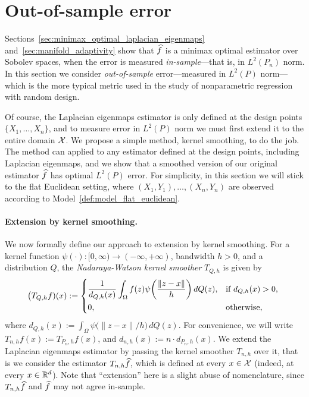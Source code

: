 \section{Out-of-sample error}
\label{sec:out_of_sample}
Sections~\ref{sec:minimax_optimal_laplacian_eigenmaps} and~\ref{sec:manifold_adaptivity} show that $\widehat{f}$ is a minimax optimal estimator over Sobolev spaces, when the error is measured \emph{in-sample}---that is, in $L^2(P_n)$ norm. In this section we consider \emph{out-of-sample} error---measured in $L^2(P)$ norm---which is the more typical metric used in the study of nonparametric regression with random design. 

Of course, the Laplacian eigenmaps estimator is only defined at the design points $\{X_1,\ldots,X_n\}$, and to measure error in $L^2(P)$ norm we must first extend it to the entire domain $\mathcal{X}$. We propose a simple method, kernel smoothing, to do the job. The method can applied to any estimator defined at the design points, including Laplacian eigenmaps, and we show that a smoothed version of our original estimator $\widehat{f}$ has optimal $L^2(P)$ error. For simplicity, in this section we will stick to the flat Euclidean setting, where $(X_1,Y_1),\ldots,(X_n,Y_n)$ are observed according to Model~\ref{def:model_flat_euclidean}.

\paragraph{Extension by kernel smoothing.}
We now formally define our approach to extension by kernel smoothing. For a kernel function $\psi(\cdot): [0,\infty) \to (-\infty,+\infty)$, bandwidth $h > 0$, and a distribution $Q$, the \emph{Nadaraya-Watson kernel smoother} $T_{Q,h}$ is given by
\begin{equation*}
\bigl(T_{Q,h}f)(x) := 
\begin{dcases*}
\frac{1}{d_{Q,h}(x)} \int_{\Omega} f(z)\psi\biggl(\frac{\|z - x\|}{h}\biggr) \,dQ(z), & \textrm{if $d_{Q,h}(x) > 0$,} \\
0, &\textrm{otherwise,}
\end{dcases*}
\end{equation*}
where $d_{Q,h}(x) := \int_{\Omega} \psi\bigl(\|z - x\|/h\bigr) \,dQ(z)$. For convenience, we will write $T_{n,h}f(x) := T_{P_n,h}f(x)$, and $d_{n,h}(x) := n \cdot d_{P_n,h}(x)$.  We extend the Laplacian eigenmaps estimator by passing the kernel smoother $T_{n,h}$ over it, that is we consider the estimator $T_{n,h}\widehat{f}$, which is defined at every $x \in \mathcal{X}$ (indeed, at every $x \in \mathbb{R}^d$). Note that ``extension'' here is a slight abuse of nomenclature, since $T_{n,h}\widehat{f}$ and $\widehat{f}$ may not agree in-sample.

